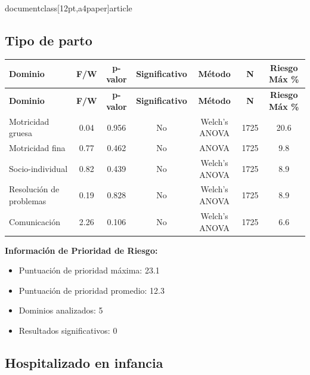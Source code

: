 \\documentclass[12pt,a4paper]{article}
\begin{document}
\vspace{0.5cm}


\subsection{Tipo de parto}


\begin{longtable}{|l|c|c|c|c|c|c|}
\hline
\textbf{Dominio} & \textbf{F/W} & \textbf{p-valor} & \textbf{Significativo} & \textbf{Método} & \textbf{N} & \textbf{Riesgo Máx \%} \\
\hline
\endfirsthead

\hline
\textbf{Dominio} & \textbf{F/W} & \textbf{p-valor} & \textbf{Significativo} & \textbf{Método} & \textbf{N} & \textbf{Riesgo Máx \%} \\
\hline
\endhead

\hline
\endfoot

\hline
\endlastfoot

Motricidad gruesa & 0.04 & 0.956 & No & Welch's ANOVA & 1725 & 20.6 \\
Motricidad fina & 0.77 & 0.462 & No & ANOVA & 1725 & 9.8 \\
Socio-individual & 0.82 & 0.439 & No & Welch's ANOVA & 1725 & 8.9 \\
Resolución de problemas & 0.19 & 0.828 & No & Welch's ANOVA & 1725 & 8.9 \\
Comunicación & 2.26 & 0.106 & No & Welch's ANOVA & 1725 & 6.6 \\

\end{longtable}


\textbf{Información de Prioridad de Riesgo:}
\begin{itemize}
\item Puntuación de prioridad máxima: 23.1
\item Puntuación de prioridad promedio: 12.3
\item Dominios analizados: 5
\item Resultados significativos: 0
\end{itemize}


\subsection{Hospitalizado en infancia}
\end{document}
